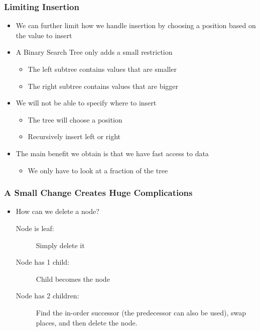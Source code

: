 \documentclass[11pt]{beamer}
\begin{document}
\begin{frame}\frametitle{Limiting Insertion}
\begin{itemize}
\item We can further limit how we handle insertion by choosing a position based on the value to insert
\item A Binary Search Tree only adds a small restriction
    \begin{itemize}
    \item The left subtree contains values that are smaller
    \item The right subtree contains values that are bigger
    \end{itemize}
\item We will not be able to specify where to insert
    \begin{itemize}
    \item The tree will choose a position
    \item Recursively insert left or right
    \end{itemize}
\item The main benefit we obtain is that we have fast access to data
    \begin{itemize}
    \item We only have to look at a fraction of the tree
    \end{itemize}
\end{itemize}
\end{frame}

\begin{frame}\frametitle{A Small Change Creates Huge Complications}
\begin{itemize}
\item How can we delete a node?
\begin{description}
\item[Node is leaf:] Simply delete it
\item[Node has 1 child:] Child becomes the node
\item[Node has 2 children:] Find the in-order successor (the predecessor can also be used), swap places, and then delete the node.
\end{description}
\end{itemize}
\end{frame}
\end{document}
